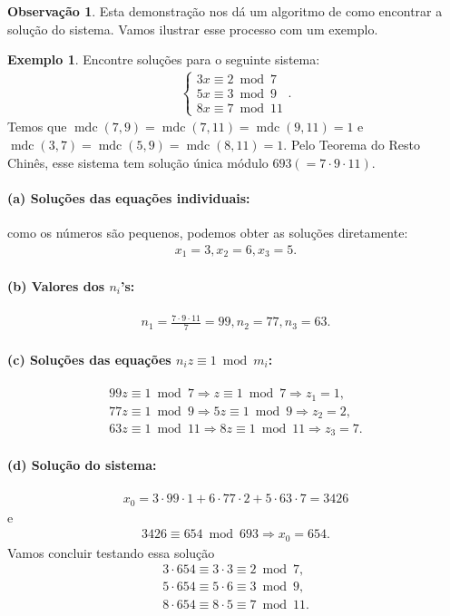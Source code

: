 \documentclass[a4paper,11pt,twoside, leqno]{article}
\DeclareMathOperator{\mdc}{mdc}
\theoremstyle{definition}
\newtheorem{remark}{Observação}[section]
\newtheorem*{example}{Exemplo}
\begin{document}
\begin{remark}
	Esta demonstração nos dá um algoritmo de como encontrar a solução do sistema. Vamos ilustrar esse processo com um exemplo.
\end{remark}
\begin{example}
	Encontre soluções para o seguinte sistema:
	\begin{align*}
	\begin{cases}
	3x\equiv 2\bmod 7 \\
	5x\equiv 3\bmod 9 \\
	8x\equiv 7\bmod 11
	\end{cases}.
	\end{align*}
	Temos que $\mdc(7,9) = \mdc(7,11) = \mdc(9,11) = 1$ e $\mdc(3,7) = \mdc(5,9) = \mdc(8,11) = 1$. Pelo Teorema do Resto Chinês, esse sistema tem solução única módulo $693 (=7\cdot 9\cdot 11)$.
	\paragraph{(a) Soluções das equações individuais:} como os números são pequenos, podemos obter as soluções diretamente:
	\begin{align*}
	x_1 = 3, x_2 = 6, x_3 = 5.
	\end{align*}
	\paragraph{(b) Valores dos $n_i$'s:} 
	\begin{align*}
	n_1 = \frac{7\cdot 9\cdot 11}{7} = 99, n_2 = 77, n_3 = 63.
	\end{align*}
	\paragraph{(c) Soluções das equações $n_iz\equiv 1\bmod m_i$:} 
	\begin{align*}
	99z\equiv 1\bmod 7 \Rightarrow z\equiv 1\bmod 7 \Rightarrow z_1 = 1, \\
	77z\equiv 1\bmod 9 \Rightarrow 5z\equiv 1\bmod 9 \Rightarrow z_2 = 2, \\
	63z\equiv 1\bmod 11 \Rightarrow 8z\equiv 1\bmod 11 \Rightarrow z_3 = 7. 
	\end{align*}
	\paragraph{(d) Solução do sistema:}
	\begin{align*}
	x_0 = 3\cdot 99\cdot 1 + 6\cdot 77\cdot 2 + 5\cdot 63\cdot 7 = 3426
	\end{align*}
	e
	\begin{align*}
	3426\equiv 654\bmod 693 \Rightarrow x_0 = 654.
	\end{align*}
	Vamos concluir testando essa solução
	\begin{align*}
	3\cdot 654 \equiv 3\cdot 3\equiv 2\bmod 7, \\
	5\cdot 654 \equiv 5\cdot 6\equiv 3\bmod 9, \\
	8\cdot 654 \equiv 8\cdot 5\equiv 7\bmod 11. \\
	\end{align*}
\end{example}
\end{document}
